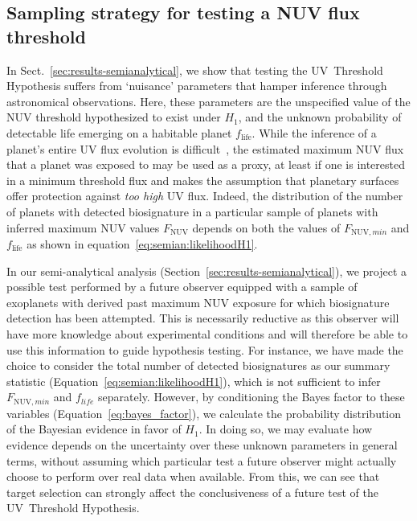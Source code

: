 \documentclass[twocolumn,twocolappendix,linenumbers]{aastex631}
\begin{document}
\subsection{Sampling strategy for testing a \gls{NUV} flux threshold} %
In Sect.~\ref{sec:results-semianalytical}, we show that testing the UV~Threshold Hypothesis suffers from `nuisance' parameters that hamper inference through astronomical observations.
Here, these parameters are the unspecified value of the \gls{NUV} threshold hypothesized to exist under $H_1$, and the unknown probability of detectable life emerging on a habitable planet $f_{\mathrm{life}}$.
While the inference of a planet's entire \gls{UV} flux evolution is difficult~\citep[e.g.,][]{Richey-Yowell2023}, the estimated maximum \gls{NUV} flux that a planet was exposed to may be used as a proxy, at least if one is interested in a minimum threshold flux and makes the assumption that planetary surfaces offer protection against \textit{too high} UV flux.
Indeed, the distribution of the number of planets with detected biosignature in a particular sample of planets with inferred maximum \gls{NUV} values $F_{\mathrm{NUV}}$ depends on both the values of $F_{\mathrm{NUV},min}$ and $f_{\mathrm{life}}$ as shown in equation~\ref{eq:semian:likelihoodH1}.

In our semi-analytical analysis (Section~\ref{sec:results-semianalytical}), we project a possible test performed by a future observer equipped with a sample of exoplanets with derived past maximum \gls{NUV} exposure for which biosignature detection has been attempted.
This is necessarily reductive as this observer will have more knowledge about experimental conditions and will therefore be able to use this information to guide hypothesis testing.
For instance, we have made the choice to consider the total number of detected biosignatures as our summary statistic (Equation~\ref{eq:semian:likelihoodH1}), which is not sufficient to infer $F_{\mathrm{NUV},min}$ and $f_{life}$ separately.
However, by conditioning the Bayes factor to these variables (Equation~\ref{eq:bayes_factor}), we calculate the probability distribution of the Bayesian evidence in favor of $H_1$.
In doing so, we may evaluate how evidence depends on the uncertainty over these unknown parameters in general terms, without assuming which particular test a future observer might actually choose to perform over real data when available.
From this, we can see that target selection can strongly affect the conclusiveness of a future test of the UV~Threshold Hypothesis.
\end{document}
